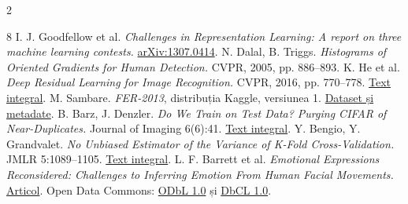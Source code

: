 \documentclass[10pt,a4paper]{article}
\begin{document}
\begin{multicols}{2}
\columnbreak
\small
\renewcommand{\refname}{Referințe}
\begin{thebibliography}{8}
\setlength{\itemsep}{4pt}\setlength{\parskip}{0pt}
 I. J. Goodfellow et al. \emph{Challenges in Representation
Learning: A report on three machine learning contests.}
\href{https://arxiv.org/abs/1307.0414}{arXiv:1307.0414}.
 N. Dalal, B. Triggs. \emph{Histograms of Oriented Gradients
for Human Detection.} CVPR, 2005, pp. 886--893.
 K. He et al. \emph{Deep Residual Learning for Image
Recognition.} CVPR, 2016, pp. 770--778.
\href{https://arxiv.org/abs/1512.03385}{Text integral}.
 M. Sambare. \emph{FER-2013}, distribuția Kaggle, versiunea 1.
\href{https://www.kaggle.com/datasets/msambare/fer2013}{Dataset și metadate}.
 B. Barz, J. Denzler. \emph{Do We Train on Test Data?
Purging CIFAR of Near-Duplicates.} Journal of Imaging 6(6):41.
\href{https://doi.org/10.3390/jimaging6060041}{Text integral}.
 Y. Bengio, Y. Grandvalet. \emph{No Unbiased Estimator of the
Variance of K-Fold Cross-Validation.} JMLR 5:1089--1105.
\href{https://jmlr.org/papers/v5/grandvalet04a.html}{Text integral}.
 L. F. Barrett et al. \emph{Emotional Expressions
Reconsidered: Challenges to Inferring Emotion From Human Facial Movements.}
\href{https://doi.org/10.1177/1529100619832930}{Articol}.
 Open Data Commons:
\href{https://opendatacommons.org/licenses/odbl/1-0/}{ODbL 1.0} și
\href{https://opendatacommons.org/licenses/dbcl/1-0/}{DbCL 1.0}.
\end{thebibliography}
\end{multicols}
\end{document}
